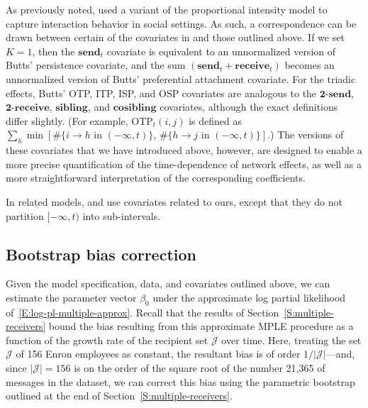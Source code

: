 \documentclass[final]{statsoc}
\begin{document}
As previously noted, \cite{butts2008relational} used a variant of the proportional
intensity model to capture interaction behavior in social settings.  As such, a correspondence can be drawn between certain of the covariates in \cite{butts2008relational} and those outlined above.  If we set
$K = 1$, then the $\textbf{send}_t$ covariate is equivalent to an unnormalized version
of Butts' persistence covariate, and the sum $(\textbf{send}_t +
\textbf{receive}_t)$ becomes an unnormalized version of Butts' preferential
attachment covariate.  For the triadic effects, Butts' OTP, ITP, ISP, and OSP
covariates are analogous to the $\textbf{2-send}$, $\textbf{2-receive}$,
$\textbf{sibling}$, and $\textbf{cosibling}$ covariates, although the exact definitions differ slightly.
(For example, $\textrm{OTP}_t(i,j)$ is
defined as $\sum_{h} \min[ \#\{ i \to h \text{ in } (-\infty, t) \}, \,
\#\{ h \to j \text{ in } (-\infty, t) \} ]$.)  The versions of these covariates that we have introduced above, however, are designed to enable a more precise quantification of the time-dependence of network effects, as well as a more straightforward interpretation of the corresponding coefficients.

In related models, \cite{vu2011continuous} and \cite{vu2011dynamic} use
covariates related to ours, except that they do not partition $[-\infty, t)$
into sub-intervals.

\subsection{Bootstrap bias correction}\label{S:enron-bootstrap}

Given the model specification, data, and covariates outlined above, we can
estimate the parameter vector $\beta_0$ under the approximate
log partial likelihood of~\eqref{E:log-pl-multiple-approx}.  Recall
that the results of Section~\ref{S:multiple-receivers} bound the bias
resulting from this approximate MPLE procedure as a function of the growth
rate of the recipient set $\mathcal{J}$ over time.  Here, treating the
set $\mathcal{J}$ of 156 Enron employees as constant, the resultant bias
is of order $1/|\mathcal{J}|$---and, since $|\mathcal{J}| = 156$ is on the
order of the square root of the number 21,365 of messages in the dataset,
we can correct this bias using the parametric bootstrap outlined at the
end of Section~\ref{S:multiple-receivers}.
\end{document}
